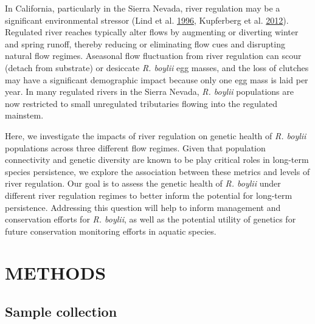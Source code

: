 \documentclass[proquest,12pt,final]{ucthesis-CA2012} %
\begin{document}
\begin{ucmainmatter}
In California, particularly in the Sierra Nevada, river regulation may
be a significant environmental stressor (Lind et al.
\protect\hyperlink{ref-lind_effects_1996}{1996}, Kupferberg et al.
\protect\hyperlink{ref-kupferberg_effects_2012}{2012}). Regulated river
reaches typically alter flows by augmenting or diverting winter and
spring runoff, thereby reducing or eliminating flow cues and disrupting
natural flow regimes. Aseasonal flow fluctuation from river regulation
can scour (detach from substrate) or desiccate \emph{R. boylii} egg
masses, and the loss of clutches may have a significant demographic
impact because only one egg mass is laid per year. In many regulated
rivers in the Sierra Nevada, \emph{R. boylii} populations are now
restricted to small unregulated tributaries flowing into the regulated
mainstem.

\par

Here, we investigate the impacts of river regulation on genetic health
of \emph{R. boylii} populations across three different flow regimes.
Given that population connectivity and genetic diversity are known to be
play critical roles in long-term species persistence, we explore the
association between these metrics and levels of river regulation. Our
goal is to assess the genetic health of \emph{R. boylii} under different
river regulation regimes to better inform the potential for long-term
persistence. Addressing this question will help to inform management and
conservation efforts for \emph{R. boylii}, as well as the potential
utility of genetics for future conservation monitoring efforts in
aquatic species.

\hypertarget{methods}{%
\section{METHODS}\label{methods}}

\hypertarget{sample-collection}{%
\subsection{Sample collection}\label{sample-collection}}


\end{ucmainmatter}
\end{document}

